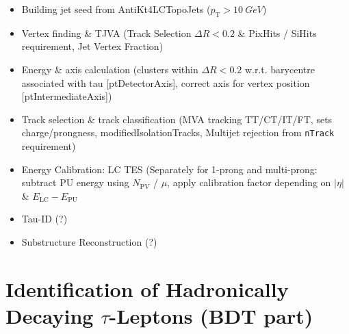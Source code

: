 \begin{itemize}
\item Building jet seed from AntiKt4LCTopoJets ($p_\mathrm{T} > \SI{10}{GeV}$)

\item Vertex finding \& TJVA (Track Selection $\Delta R < 0.2$ \& PixHits /
  SiHits requirement, Jet Vertex Fraction)

\item Energy \& axis calculation (clusters within $\Delta R < 0.2$ w.r.t.
  barycentre associated with tau [ptDetectorAxis], correct axis for vertex
  position [ptIntermediateAxis])

\item Track selection \& track classification (MVA tracking TT/CT/IT/FT, sets
  charge/prongness, modifiedIsolationTracks, Multijet rejection from
  \texttt{nTrack} requirement)

\item Energy Calibration: LC \textrightarrow TES (Separately for 1-prong and
  multi-prong: subtract PU energy using $N_\mathrm{PV}$ / $\mu$, apply
  calibration factor depending on $|\eta|$ \& $E_\mathrm{LC} - E_\mathrm{PU}$

\item Tau-ID (?)

\item Substructure Reconstruction (?)
\end{itemize}

\section{Identification of Hadronically Decaying $\tau$-Leptons (BDT part)}

